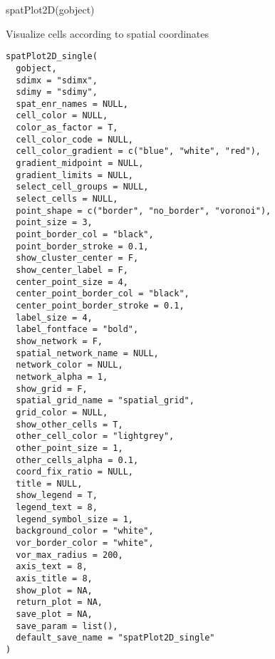 \documentclass[a4paper]{book}
\begin{document}
%
\begin{SeeAlso}\relax
{}
\end{SeeAlso}
%
\begin{Examples}
\begin{ExampleCode}
    spatPlot2D(gobject)
\end{ExampleCode}
\end{Examples}
%
\begin{Description}\relax
Visualize cells according to spatial coordinates
\end{Description}
%
\begin{Usage}
\begin{verbatim}
spatPlot2D_single(
  gobject,
  sdimx = "sdimx",
  sdimy = "sdimy",
  spat_enr_names = NULL,
  cell_color = NULL,
  color_as_factor = T,
  cell_color_code = NULL,
  cell_color_gradient = c("blue", "white", "red"),
  gradient_midpoint = NULL,
  gradient_limits = NULL,
  select_cell_groups = NULL,
  select_cells = NULL,
  point_shape = c("border", "no_border", "voronoi"),
  point_size = 3,
  point_border_col = "black",
  point_border_stroke = 0.1,
  show_cluster_center = F,
  show_center_label = F,
  center_point_size = 4,
  center_point_border_col = "black",
  center_point_border_stroke = 0.1,
  label_size = 4,
  label_fontface = "bold",
  show_network = F,
  spatial_network_name = NULL,
  network_color = NULL,
  network_alpha = 1,
  show_grid = F,
  spatial_grid_name = "spatial_grid",
  grid_color = NULL,
  show_other_cells = T,
  other_cell_color = "lightgrey",
  other_point_size = 1,
  other_cells_alpha = 0.1,
  coord_fix_ratio = NULL,
  title = NULL,
  show_legend = T,
  legend_text = 8,
  legend_symbol_size = 1,
  background_color = "white",
  vor_border_color = "white",
  vor_max_radius = 200,
  axis_text = 8,
  axis_title = 8,
  show_plot = NA,
  return_plot = NA,
  save_plot = NA,
  save_param = list(),
  default_save_name = "spatPlot2D_single"
)
\end{verbatim}
\end{Usage}
%
\end{document}
